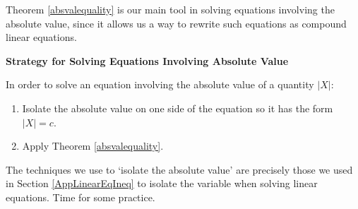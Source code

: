 \medskip

Theorem \ref{absvalequality} is our main tool in solving equations involving the absolute value, since it allows us a way to rewrite such equations as compound linear equations.

\medskip

\label{strategyforsolvingabseqns}

\colorbox{ResultColor}{\bbm

\centerline{\textbf{Strategy for Solving Equations Involving Absolute Value}}

\vspace{0.05in}

In order to solve an equation involving the absolute value of a quantity $|X|$:

\begin{enumerate}

\item  Isolate the absolute value on one side of the equation so it has the form $|X| = c$.

\item  Apply Theorem \ref{absvalequality}.

\end{enumerate}

\ebm}

\smallskip

The techniques we use to `isolate the absolute value' are precisely those we used in Section \ref{AppLinearEqIneq} to isolate the variable when solving linear equations.  Time for some practice.

\enlargethispage{.5in}

